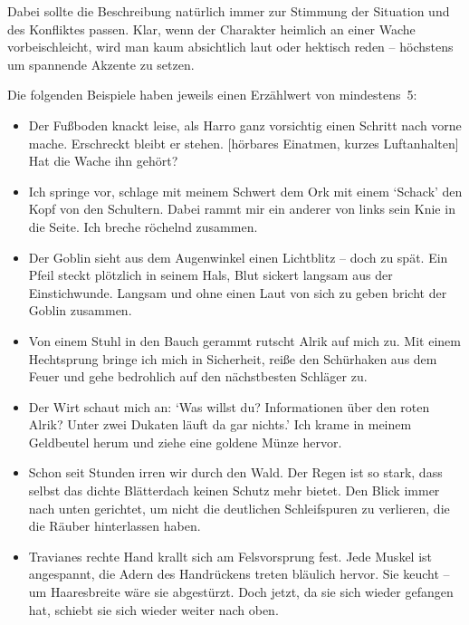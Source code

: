 Dabei sollte die Beschreibung natürlich immer zur Stimmung der Situation und des Konfliktes passen. Klar, wenn der Charakter heimlich an einer Wache vorbeischleicht, wird man kaum absichtlich laut oder hektisch reden -- höchstens um spannende Akzente zu setzen.

\begin{beispiel}
Die folgenden Beispiele haben jeweils einen Erzählwert von mindestens~5:
\begin{itemize}
  \item {Der Fußboden knackt leise, als Harro ganz vorsichtig einen Schritt nach vorne mache. Erschreckt bleibt er stehen. [hörbares Einatmen, kurzes Luftanhalten] Hat die Wache ihn gehört?}

  \item Ich springe vor, schlage mit meinem Schwert dem Ork mit einem `Schack' den Kopf von den Schultern. Dabei rammt mir ein anderer von links sein Knie in die Seite. Ich breche röchelnd zusammen.

  \item {Der Goblin sieht aus dem Augenwinkel einen Lichtblitz -- doch zu spät. Ein Pfeil steckt plötzlich in seinem Hals, Blut sickert langsam aus der Einstichwunde. Langsam und ohne einen Laut von sich zu geben bricht der Goblin zusammen.}

  \item {Von einem Stuhl in den Bauch gerammt rutscht Alrik auf mich zu. Mit einem Hechtsprung bringe ich mich in Sicherheit, reiße den Schürhaken aus dem Feuer und gehe bedrohlich auf den nächstbesten Schläger zu.}

  \item Der Wirt schaut mich an: `Was willst du? Informationen über den roten Alrik? Unter zwei Dukaten läuft da gar nichts.' Ich krame in meinem Geldbeutel herum und ziehe eine goldene Münze hervor.

  \item Schon seit Stunden irren wir durch den Wald. Der Regen ist so stark, dass selbst das dichte Blätterdach keinen Schutz mehr bietet. Den Blick immer nach unten gerichtet, um nicht die deutlichen Schleifspuren zu verlieren, die die Räuber hinterlassen haben.

  \item {Travianes rechte Hand krallt sich am Felsvorsprung fest. Jede Muskel ist angespannt, die Adern des Handrückens treten bläulich hervor. Sie keucht -- um Haaresbreite wäre sie abgestürzt. Doch jetzt, da sie sich wieder gefangen hat, schiebt sie sich wieder weiter nach oben.}
\end{itemize}
\end{beispiel}



